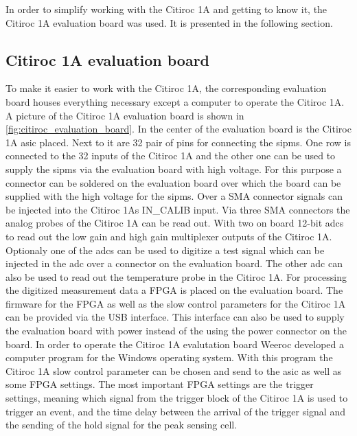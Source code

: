In order to simplify working with the Citiroc 1A and getting to know it, the Citiroc 1A evaluation board was used.
It is presented in the following section.








\subsection{Citiroc 1A evaluation board}

To make it easier to work with the Citiroc 1A, the corresponding evaluation board houses everything necessary except a computer to operate the Citiroc 1A.
A picture of the Citiroc 1A evaluation board is shown in \autoref{fig:citiroc_evaluation_board}.
In the center of the evaluation board is the Citiroc 1A \ac{asic} placed.
Next to it are 32 pair of pins for connecting the \ac{sipm}s.
One row is connected to the 32 inputs of the Citiroc 1A and the other one can be used to supply the \ac{sipm}s via the evaluation board with high voltage.
For this purpose a connector can be soldered on the evaluation board over which the board can be supplied with the high voltage for the \ac{sipm}s.
Over a SMA connector signals can be injected into the Citiroc 1As IN\_CALIB input.
Via three SMA connectors the analog probes of the Citiroc 1A can be read out.
With two on board 12-bit \ac{adc}s to read out the low gain and high gain multiplexer outputs of the Citiroc 1A.
Optionaly one of the \ac{adc}s can be used to digitize a test signal which can be injected in the \ac{adc} over a connector on the evaluation board.
The other \ac{adc} can also be used to read out the temperature probe in the Citiroc 1A.
For processing the digitized measurement data a FPGA is placed on the evaluation board.
The firmware for the FPGA as well as the slow control parameters for the Citiroc 1A can be provided via the USB interface.
This interface can also be used to supply the evaluation board with power instead of the using the power connector on the board.
In order to operate the Citiroc 1A evalutation board Weeroc developed a computer program for the Windows operating system.
With this program the Citiroc 1A slow control parameter can be chosen and send to the \ac{asic} as well as some FPGA settings.
The most important FPGA settings are the trigger settings, meaning which signal from the trigger block of the Citiroc 1A is used to trigger an event, and the time delay between the arrival of the trigger signal and the sending of the hold signal for the peak sensing cell.

